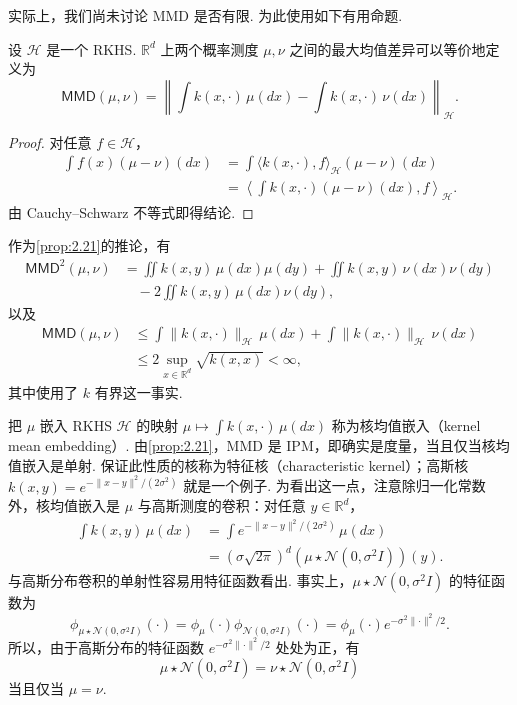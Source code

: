 实际上，我们尚未讨论 MMD 是否有限. 为此使用如下有用命题.
\begin{proposition}\label{prop:2.21}
设 $\mathcal H$ 是一个 RKHS. $\mathbb R^d$ 上两个概率测度 $\mu,\nu$ 之间的最大均值差异可以等价地定义为
$$\mathsf{MMD}(\mu,\nu)=\left\lVert\int k(x,\cdot)\,\mu(dx)-\int k(x,\cdot)\,\nu(dx)\right\rVert_{\mathcal H}.$$
\end{proposition}
\begin{proof}
对任意 $f\in\mathcal H$，
$$\begin{aligned}
\int f(x)(\mu-\nu)(dx)
&=\int\langle k(x,\cdot),f\rangle_{\mathcal H}(\mu-\nu)(dx)\\
&=\left\langle\int k(x,\cdot)(\mu-\nu)(dx),f\right\rangle_{\mathcal H}.
\end{aligned}$$
由 Cauchy--Schwarz 不等式即得结论.
\end{proof}
作为\autoref{prop:2.21}的推论，有
\begin{equation}\label{eq:2.19}
\begin{aligned}
\mathsf{MMD}^2(\mu,\nu)
&=\iint k(x,y)\,\mu(dx)\mu(dy)+\iint k(x,y)\,\nu(dx)\nu(dy)\\
&\quad-2\iint k(x,y)\,\mu(dx)\nu(dy),
\end{aligned}
\end{equation}
以及
$$\begin{aligned}
\mathsf{MMD}(\mu,\nu)
&\le\int\lVert k(x,\cdot)\rVert_{\mathcal H}\,\mu(dx)+\int\lVert k(x,\cdot)\rVert_{\mathcal H}\,\nu(dx)\\
&\le2\sup_{x\in\mathbb R^d}\sqrt{k(x,x)}<\infty,
\end{aligned}$$
其中使用了 $k$ 有界这一事实.

把 $\mu$ 嵌入 RKHS $\mathcal H$ 的映射 $\mu\mapsto\int k(x,\cdot)\,\mu(dx)$ 称为核均值嵌入（kernel mean embedding）. 由\autoref{prop:2.21}，MMD 是 IPM，即确实是度量，当且仅当核均值嵌入是单射. 保证此性质的核称为特征核（characteristic kernel）；高斯核 $k(x,y)=e^{-\lVert x-y\rVert^2/(2\sigma^2)}$ 就是一个例子. 为看出这一点，注意除归一化常数外，核均值嵌入是 $\mu$ 与高斯测度的卷积：对任意 $y\in\mathbb R^d$，
$$\begin{aligned}
\int k(x,y)\,\mu(dx)
&=\int e^{-\lVert x-y\rVert^2/(2\sigma^2)}\,\mu(dx)\\
&=(\sigma\sqrt{2\pi})^d(\mu\star\mathcal N(0,\sigma^2I))(y).
\end{aligned}$$
与高斯分布卷积的单射性容易用特征函数看出. 事实上，$\mu\star\mathcal N(0,\sigma^2I)$ 的特征函数为
$$\phi_{\mu\star\mathcal N(0,\sigma^2I)}(\cdot)
=\phi_\mu(\cdot)\phi_{\mathcal N(0,\sigma^2I)}(\cdot)
=\phi_\mu(\cdot)e^{-\sigma^2\lVert\cdot\rVert^2/2}.$$
所以，由于高斯分布的特征函数 $e^{-\sigma^2\lVert\cdot\rVert^2/2}$ 处处为正，有
$$\mu\star\mathcal N(0,\sigma^2I)=\nu\star\mathcal N(0,\sigma^2I)$$
当且仅当 $\mu=\nu$.

